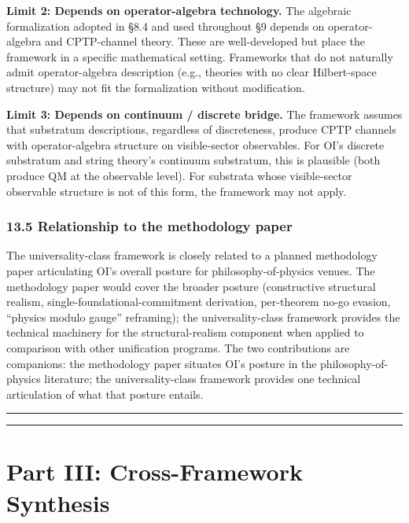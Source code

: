 \documentclass[
]{article}
\begin{document}
\textbf{Limit 2: Depends on operator-algebra technology.} The algebraic
formalization adopted in §8.4 and used throughout §9 depends on
operator-algebra and CPTP-channel theory. These are well-developed but
place the framework in a specific mathematical setting. Frameworks that
do not naturally admit operator-algebra description (e.g., theories with
no clear Hilbert-space structure) may not fit the formalization without
modification.

\textbf{Limit 3: Depends on continuum / discrete bridge.} The framework
assumes that substratum descriptions, regardless of discreteness,
produce CPTP channels with operator-algebra structure on visible-sector
observables. For OI's discrete substratum and string theory's continuum
substratum, this is plausible (both produce QM at the observable level).
For substrata whose visible-sector observable structure is not of this
form, the framework may not apply.

\hypertarget{relationship-to-the-methodology-paper}{%
\subsubsection{13.5 Relationship to the methodology
paper}\label{relationship-to-the-methodology-paper}}

The universality-class framework is closely related to a planned
methodology paper articulating OI's overall posture for
philosophy-of-physics venues. The methodology paper would cover the
broader posture (constructive structural realism,
single-foundational-commitment derivation, per-theorem no-go evasion,
``physics modulo gauge'' reframing); the universality-class framework
provides the technical machinery for the structural-realism component
when applied to comparison with other unification programs. The two
contributions are companions: the methodology paper situates OI's
posture in the philosophy-of-physics literature; the universality-class
framework provides one technical articulation of what that posture
entails.

\begin{center}\rule{0.5\linewidth}{0.5pt}\end{center}

\begin{center}\rule{0.5\linewidth}{0.5pt}\end{center}

\hypertarget{part-iii-cross-framework-synthesis}{%
\section{Part III: Cross-Framework
Synthesis}\label{part-iii-cross-framework-synthesis}}
\end{document}
